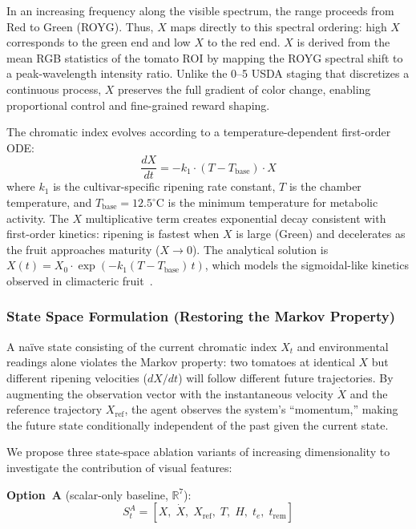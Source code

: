 \documentclass[conference]{IEEEtran}
\begin{document}
    \noindent In an increasing frequency along the visible spectrum, the range proceeds from Red to Green (ROYG). Thus, $X$ maps directly to this spectral ordering: high $X$ corresponds to the green end and low $X$ to the red end.  $X$ is derived from the mean RGB statistics of the tomato ROI by mapping the ROYG spectral shift to a peak-wavelength intensity ratio.  Unlike the 0--5 USDA staging that discretizes a continuous process, $X$ preserves the full gradient of color change, enabling proportional control and fine-grained reward shaping.

    The chromatic index evolves according to a temperature-dependent first-order ODE:
    \begin{equation}
    \frac{dX}{dt} = -k_1 \cdot (T - T_{\text{base}}) \cdot X
    \label{eq:ripening}
    \end{equation}
    \noindent where $k_1$ is the cultivar-specific ripening rate constant, $T$ is the chamber temperature, and $T_{\text{base}} = 12.5^{\circ}$C is the minimum temperature for metabolic activity.  The $X$ multiplicative term creates exponential decay consistent with first-order kinetics: ripening is fastest when $X$ is large (Green) and decelerates as the fruit approaches maturity ($X \to 0$).  The analytical solution is $X(t) = X_0 \cdot \exp(-k_1 (T - T_{\text{base}}) \, t)$, which models the sigmoidal-like kinetics observed in climacteric fruit~\cite{saltveit2005}.

    \subsubsection{State Space Formulation (Restoring the Markov Property)}
    \label{sec:state_space}

    A na\"ive state consisting of the current chromatic index $X_t$ and environmental readings alone violates the Markov property: two tomatoes at identical $X$ but different ripening velocities ($dX/dt$) will follow different future trajectories.  By augmenting the observation vector with the instantaneous velocity $\dot{X}$ and the reference trajectory $X_{\text{ref}}$, the agent observes the system's ``momentum,'' making the future state conditionally independent of the past given the current state.

    We propose three state-space ablation variants of increasing dimensionality to investigate the contribution of visual features:

    \textbf{Option~A} (scalar-only baseline, $\mathbb{R}^{7}$):
    \begin{equation}
    S_t^A = \left[
    X,\; \dot{X},\; X_{\text{ref}},\;
    T,\; H,\; t_e,\; t_{\text{rem}}
    \right]
    \end{equation}
\end{document}
